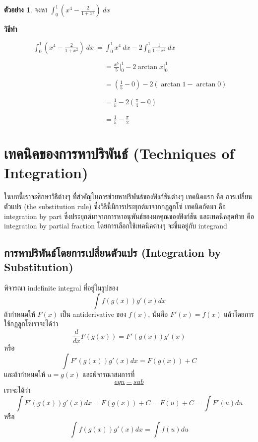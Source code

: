 \documentclass[
]{book}
\theoremstyle{definition}
\theoremstyle{definition}
\newtheorem{example}{ตัวอย่าง}[chapter]
\theoremstyle{definition}
\theoremstyle{definition}
\theoremstyle{remark}
\begin{document}
\begin{example}
จงหา \(\displaystyle \int_{0}^{1} \left( x^{4} -
\frac{2}{1+x^{2}} \right) \ dx\)
\end{example}

\textbf{วิธีทำ}

\(\qquad \qquad\ \displaystyle \int_{0}^{1} \left( x^{4} - \frac{2}{1+x^{2}}
\right) \ dx \ = \int_{0}^{1} x^{4} \ dx - 2 \int_{0}^{1} \frac{1}{1+x^{2}}
\ dx\)

\(\qquad \qquad \qquad \qquad \qquad \qquad \qquad \ \ =\displaystyle
\frac{x^{5}}{5} \bigg |_{0}^{1}-2 \arctan x \bigg |_{0}^{1}\)

\(\qquad \qquad \qquad \qquad \qquad \qquad \qquad \ \ = \displaystyle \left(
\frac{1}{5} - 0 \right) - 2 \left( \arctan 1 - \arctan 0 \right)\)

\(\qquad \qquad \qquad \qquad \qquad \qquad \qquad \ \ =\displaystyle
\frac{1}{5}-2 \left( \frac{ \pi }{4}-0 \right)\)

\(\qquad \qquad \qquad \qquad \qquad \qquad \qquad \ \ =\displaystyle
\frac{1}{5}- \frac{ \pi }{2}\)

\chapter{เทคนิคของการหาปริพันธ์ (Techniques of Integration)}\label{uxe40uxe17uxe04uxe19uxe04uxe02uxe2duxe07uxe01uxe32uxe23uxe2buxe32uxe1buxe23uxe1euxe19uxe18-techniques-of-integration}

ในบทนี้เราจะศึกษาวิธีต่างๆ ที่สำคัญในการช่วยหาปริพันธ์ของฟังก์ชันต่างๆ เทคนิคแรก คือ
การเปลี่ยนตัวแปร (the substitution rule) ซึ่งวิธีนี้มีการประยุกต์มาจากกฎลูกโซ่
เทคนิคถัดมา คือ integration by part ซึ่งประยุกต์มาจากการหาอนุพันธ์ของผลคูณของฟังก์ชัน
และเทคนิคสุดท้าย คือ integration by partial fraction โดยการเลือกใช้เทคนิคต่างๆ
จะขึ้นอยู่กับ integrand

\section{การหาปริพันธ์โดยการเปลี่ยนตัวแปร (Integration by Substitution)}\label{uxe01uxe32uxe23uxe2buxe32uxe1buxe23uxe1euxe19uxe18uxe42uxe14uxe22uxe01uxe32uxe23uxe40uxe1buxe25uxe22uxe19uxe15uxe27uxe41uxe1buxe23-integration-by-substitution}

พิจารณา indefinite integral ที่อยู่ในรูปของ \[\int f(g(x))g'(x) dx\] ถ้ากำหนดให้
\(F(x)\) เป็น antiderivative ของ \(f(x)\), นั่นคือ \(F'(x) = f(x)\)
แล้วโดยการใช้กฏลูกโซ่เราจะได้ว่า \[\frac{d}{dx} F(g(x)) = F'(g(x)) g'(x)\] หรือ
\[\label{eqn-sub}    
            \int F'(g(x)) g'(x) dx = F(g(x)) + C\] และถ้ากำหนดให้
\(u = g(x)\) และพิจารณาสมการที่ \hyperref[eqn-sub]{\[eqn-sub\]} เราจะได้ว่า
\[\int F'(g(x)) g'(x) dx = F(g(x)) + C = F(u) + C = \int F'(u) du\] หรือ
\[\int f(g(x))g'(x) dx  = \int f(u) du\]
\end{document}
